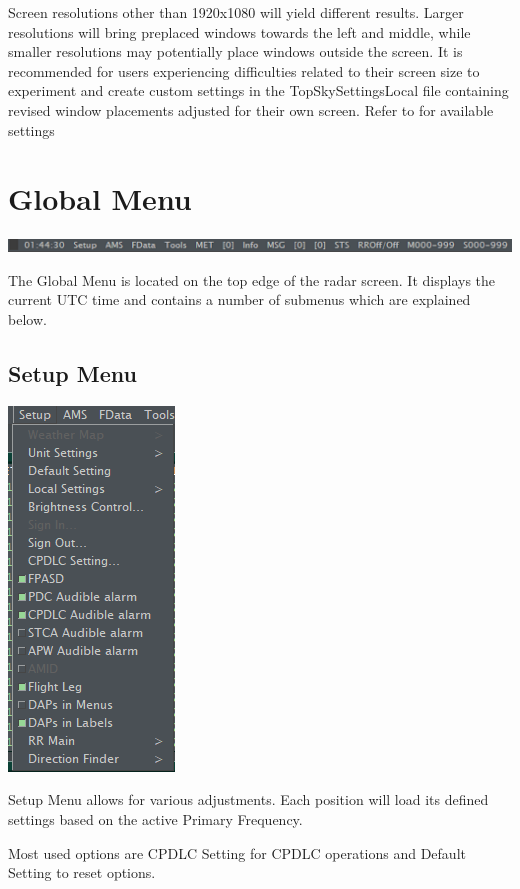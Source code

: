 \documentclass[11pt,a4paper]{memoir}
\begin{document}
Screen resolutions other than 1920x1080 will yield different results. Larger resolutions will bring preplaced windows towards the left and middle, while smaller resolutions may potentially place windows outside the screen. It is recommended for users experiencing difficulties related to their screen size to experiment and create custom settings in the TopSkySettingsLocal file containing revised window placements adjusted for their own screen. Refer to \texttt{} for available settings

\section{Global Menu}
\label{menu:global}
\includegraphics{img/globalmenu.png}

The Global Menu is located on the top edge of the radar screen. It displays the current UTC time and contains a number of submenus which are explained below.

\subsection{Setup Menu}
\label{menu:set}
\includegraphics{img/Setup.png}

Setup Menu allows for various adjustments. Each position will load its defined settings based on the active Primary Frequency.

Most used options are CPDLC Setting for CPDLC operations and Default Setting to reset options.
\end{document}
